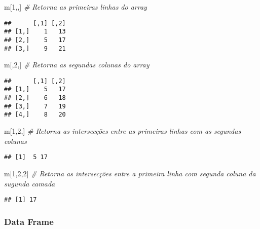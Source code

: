 \documentclass[
]{book}
\newenvironment{Shaded}{\begin{snugshade}}{\end{snugshade}}
\newcommand{\CommentTok}[1]{\textcolor[rgb]{0.56,0.35,0.01}{\textit{#1}}}
\newcommand{\DecValTok}[1]{\textcolor[rgb]{0.00,0.00,0.81}{#1}}
\newcommand{\NormalTok}[1]{#1}
\begin{document}
\begin{Shaded}
\begin{Highlighting}[]
\NormalTok{m[}\DecValTok{1}\NormalTok{,,] }\CommentTok{\# Retorna as primeiras linhas do array}
\end{Highlighting}
\end{Shaded}

\begin{verbatim}
##      [,1] [,2]
## [1,]    1   13
## [2,]    5   17
## [3,]    9   21
\end{verbatim}

\begin{Shaded}
\begin{Highlighting}[]
\NormalTok{m[,}\DecValTok{2}\NormalTok{,] }\CommentTok{\# Retorna as segundas colunas do array}
\end{Highlighting}
\end{Shaded}

\begin{verbatim}
##      [,1] [,2]
## [1,]    5   17
## [2,]    6   18
## [3,]    7   19
## [4,]    8   20
\end{verbatim}

\begin{Shaded}
\begin{Highlighting}[]
\NormalTok{m[}\DecValTok{1}\NormalTok{,}\DecValTok{2}\NormalTok{,] }\CommentTok{\# Retorna as intersecções entre as primeiras linhas com as segundas colunas}
\end{Highlighting}
\end{Shaded}

\begin{verbatim}
## [1]  5 17
\end{verbatim}

\begin{Shaded}
\begin{Highlighting}[]
\NormalTok{m[}\DecValTok{1}\NormalTok{,}\DecValTok{2}\NormalTok{,}\DecValTok{2}\NormalTok{] }\CommentTok{\# Retorna as intersecções entre a primeira linha com segunda coluna da sugunda camada}
\end{Highlighting}
\end{Shaded}

\begin{verbatim}
## [1] 17
\end{verbatim}

\hypertarget{data-frame-1}{%
\subsubsection{Data Frame}\label{data-frame-1}}
\end{document}
